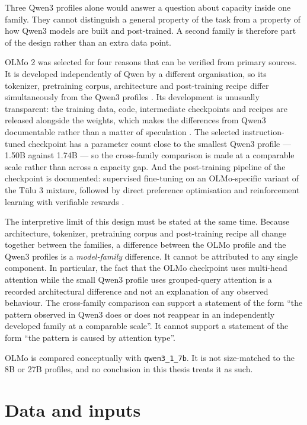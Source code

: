 Three Qwen3 profiles alone would answer a question about capacity inside one family. They cannot distinguish a general property of the task from a property of how Qwen3 models are built and post-trained. A second family is therefore part of the design rather than an extra data point.

OLMo 2 was selected for four reasons that can be verified from primary sources. It is developed independently of Qwen by a different organisation, so its tokenizer, pretraining corpus, architecture and post-training recipe differ simultaneously from the Qwen3 profiles \cite{olmo2025furious}. Its development is unusually transparent: the training data, code, intermediate checkpoints and recipes are released alongside the weights, which makes the differences from Qwen3 documentable rather than a matter of speculation \cite{olmo2025furious}. The selected instruction-tuned checkpoint has a parameter count close to the smallest Qwen3 profile --- 1.50B against 1.74B --- so the cross-family comparison is made at a comparable scale rather than across a capacity gap. And the post-training pipeline of the checkpoint is documented: supervised fine-tuning on an OLMo-specific variant of the Tülu 3 mixture, followed by direct preference optimisation and reinforcement learning with verifiable rewards \cite{allenai2025olmo2instruct1b,lambert2025tulu3}.

The interpretive limit of this design must be stated at the same time. Because architecture, tokenizer, pretraining corpus and post-training recipe all change together between the families, a difference between the OLMo profile and the Qwen3 profiles is a \emph{model-family} difference. It cannot be attributed to any single component. In particular, the fact that the OLMo checkpoint uses multi-head attention while the small Qwen3 profile uses grouped-query attention is a recorded architectural difference and not an explanation of any observed behaviour. The cross-family comparison can support a statement of the form ``the pattern observed in Qwen3 does or does not reappear in an independently developed family at a comparable scale''. It cannot support a statement of the form ``the pattern is caused by attention type''.

OLMo is compared conceptually with \texttt{qwen3\_1\_7b}. It is not size-matched to the 8B or 27B profiles, and no conclusion in this thesis treats it as such.

\section{Data and inputs}

